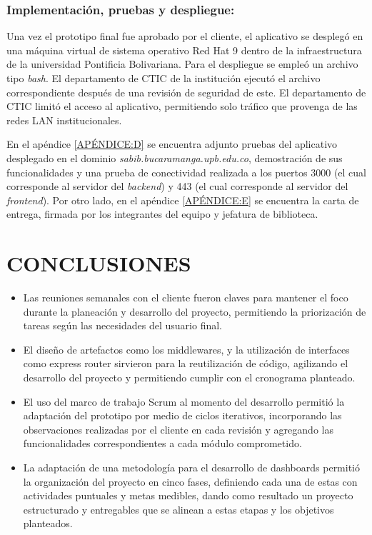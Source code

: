 \documentclass[spanish]{ieee_upb}
\begin{document}
\subsubsection[Implementación]{Implementación, pruebas y despliegue: }

Una vez el prototipo final fue aprobado por el cliente, el aplicativo se desplegó en una máquina virtual de sistema operativo Red Hat 9 dentro de la infraestructura de la universidad Pontificia Bolivariana.
Para el despliegue se empleó un archivo tipo \textit{bash}. El departamento de CTIC de la institución ejecutó el archivo correspondiente después de una revisión
de seguridad de este. El departamento de CTIC limitó el acceso al aplicativo, permitiendo solo tráfico que provenga de las redes LAN institucionales. 

\vspace{0.3cm}
En el apéndice \ref{APÉNDICE:D} se encuentra adjunto pruebas del aplicativo desplegado en el dominio \textit{sabib.bucaramanga.upb.edu.co}, demostración de sus funcionalidades y una prueba de conectividad realizada a los puertos 3000 (el cual corresponde al 
servidor del \textit{backend}) y 443 (el cual corresponde al servidor del \textit{frontend}). Por otro lado,
en el apéndice \ref{APÉNDICE:E} se encuentra la carta de entrega, firmada por los 
integrantes del equipo y jefatura de biblioteca.

\vspace{0.3cm}



\newpage
\section{CONCLUSIONES}
\begin{itemize}
  \item Las reuniones semanales con el cliente fueron claves para mantener el foco durante la planeación y desarrollo del proyecto, permitiendo la priorización de tareas según las necesidades del usuario final.
  \item El diseño de artefactos como los middlewares, y la utilización de interfaces como express router sirvieron para la reutilización de código, agilizando el desarrollo del proyecto y permitiendo cumplir con el cronograma planteado.
  \item El uso del marco de trabajo Scrum al momento del desarrollo permitió la adaptación del prototipo por medio de ciclos iterativos, incorporando las observaciones realizadas por el cliente en cada revisión y agregando las funcionalidades correspondientes a cada módulo comprometido. 
  \item La adaptación de una metodología para el desarrollo de dashboards  permitió la organización del proyecto en cinco fases, definiendo cada una de estas con actividades puntuales y metas medibles, dando como resultado un proyecto estructurado y entregables que se alinean a estas etapas y los objetivos planteados.


\end{itemize}
\newpage
\end{document}
